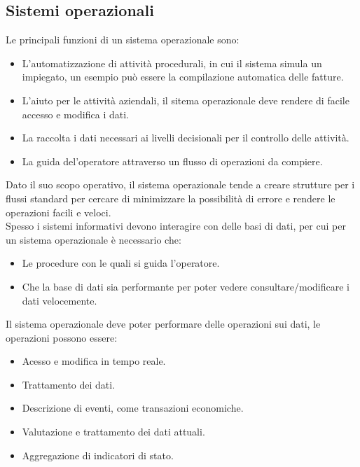 \documentclass[../main.tex]{subfiles}
\begin{document}
	\subsection{Sistemi operazionali}
	Le principali funzioni di un sistema operazionale sono:
	\begin{itemize}
		\item L'automatizzazione di attività procedurali, in cui il sistema simula un impiegato, un esempio può essere la compilazione automatica delle fatture.
		\item L'aiuto per le attività aziendali, il sitema operazionale deve rendere di facile accesso e modifica i dati.
		\item La raccolta i dati necessari ai livelli decisionali per il controllo delle attività.
		\item La guida del'operatore attraverso un flusso di operazioni da compiere.
	\end{itemize}
	Dato il suo scopo operativo, il sistema operazionale tende a creare strutture per i flussi standard per cercare di minimizzare la possibilità di errore e rendere le operazioni facili e veloci.\\
	Spesso i sistemi informativi devono interagire con delle basi di dati, per cui per un sistema operazionale è necessario che:
	\begin{itemize}
		\item Le procedure con le quali si guida l'operatore.
		\item Che la base di dati sia performante per poter vedere consultare/modificare i dati velocemente.
	\end{itemize}
	Il sistema operazionale deve poter performare delle operazioni sui dati, le operazioni possono essere:
	\begin{itemize}
		\item Acesso e modifica in tempo reale.
		\item Trattamento dei dati.
		\item Descrizione di eventi, come transazioni economiche.
		\item Valutazione e trattamento dei dati attuali.
		\item Aggregazione di indicatori di stato.
	\end{itemize}
\end{document}
